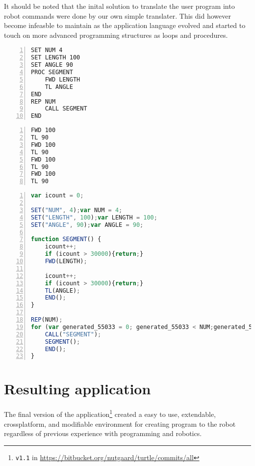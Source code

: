 \bigskip\noindent
It should be noted that the inital solution to translate the user program into robot commands were done by our own simple translater. This did however become infeasble to maintain as the application language evolved and started to touch on more advanced programming structures as loops and procedures.  

\begin{minipage}{\linewidth}
	\begin{lstlisting}[frame=single,numbers=left,caption={Example code for creating a square using variables, procedures and loop.},language=MyBasic,label=lst:loop]
SET NUM 4
SET LENGTH 100
SET ANGLE 90
PROC SEGMENT
    FWD LENGTH
    TL ANGLE
END 
REP NUM
    CALL SEGMENT
END 
	\end{lstlisting}
	\begin{lstlisting}[frame=single,numbers=left,caption={Commands sent to simulator},language=MyBasic,label=lst:commands]
FWD 100
TL 90
FWD 100
TL 90
FWD 100
TL 90
FWD 100
TL 90
	\end{lstlisting}
\end{minipage}
\begin{minipage}{\linewidth}
	\begin{lstlisting}[frame=single,numbers=left,caption={The internal representation of the previous program.},language=Javascript,label=lst:internal]
var icount = 0; 

SET("NUM", 4);var NUM = 4; 
SET("LENGTH", 100);var LENGTH = 100; 
SET("ANGLE", 90);var ANGLE = 90; 

function SEGMENT() { 
	icount++; 
	if (icount > 30000){return;} 
	FWD(LENGTH); 

	icount++; 
	if (icount > 30000){return;} 
	TL(ANGLE); 
	END();
} 

REP(NUM);
for (var generated_55033 = 0; generated_55033 < NUM;generated_55033++) { 
	CALL("SEGMENT");
	SEGMENT(); 
	END();
}
	\end{lstlisting}
\end{minipage}

\section{Resulting application}
The final version of the application\footnote{\texttt{v1.1} in \url{https://bitbucket.org/nutgaard/turtle/commits/all}} created a easy to use, extendable, crossplatform, and modifiable environment for creating program to the robot regardless of previous experience with programming and robotics. 

